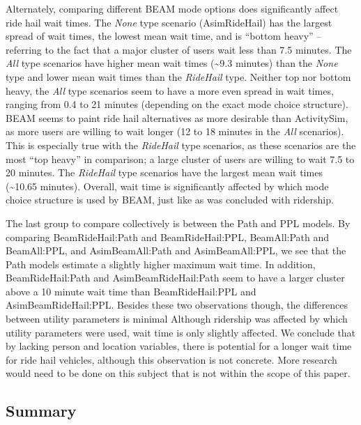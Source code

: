 \documentclass[12pt, oneside, openright]{byuthesis}
\begin{document}
Alternately, comparing different BEAM mode options does significantly affect ride hail wait times. The \emph{None} type scenario (AsimRideHail) has the largest spread of wait times, the lowest mean wait time, and is ``bottom heavy'' -- referring to the fact that a major cluster of users wait less than 7.5 minutes. The \emph{All} type scenarios have higher mean wait times (\textasciitilde9.3 minutes) than the \emph{None} type and lower mean wait times than the \emph{RideHail} type. Neither top nor bottom heavy, the \emph{All} type scenarios seem to have a more even spread in wait times, ranging from 0.4 to 21 minutes (depending on the exact mode choice structure). BEAM seems to paint ride hail alternatives as more desirable than ActivitySim, as more users are willing to wait longer (12 to 18 minutes in the \emph{All} scenarios). This is especially true with the \emph{RideHail} type scenarios, as these scenarios are the most ``top heavy'' in comparison; a large cluster of users are willing to wait 7.5 to 20 minutes. The \emph{RideHail} type scenarios have the largest mean wait times (\textasciitilde10.65 minutes). Overall, wait time is significantly affected by which mode choice structure is used by BEAM, just like as was concluded with ridership.

The last group to compare collectively is between the Path and PPL models. By comparing BeamRideHail:Path and BeamRideHail:PPL, BeamAll:Path and BeamAll:PPL, and AsimBeamAll:Path and AsimBeamAll:PPL, we see that the Path models estimate a slightly higher maximum wait time. In addition, BeamRideHail:Path and AsimBeamRideHail:Path seem to have a larger cluster above a 10 minute wait time than BeamRideHail:PPL and AsimBeamRideHail:PPL. Besides these two observations though, the differences between utility parameters is minimal Although ridership was affected by which utility parameters were used, wait time is only slightly affected. We conclude that by lacking person and location variables, there is potential for a longer wait time for ride hail vehicles, although this observation is not concrete. More research would need to be done on this subject that is not within the scope of this paper.

\hypertarget{summary-1}{%
\subsection{Summary}\label{summary-1}}
\end{document}
